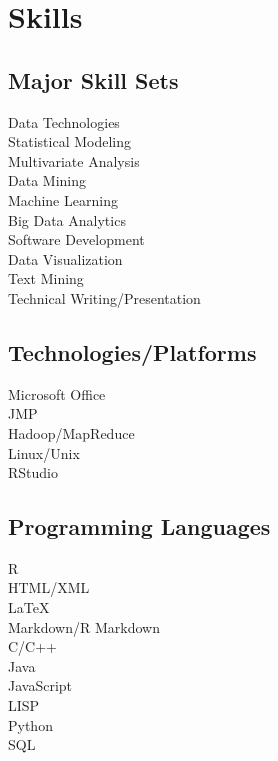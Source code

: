 \documentclass[letterpaper]{deedy-resume} %
\begin{document}
\begin{minipage}[t]{0.35\textwidth}

\section{Skills}
\subsection{Major Skill Sets}
Data Technologies\\
Statistical Modeling\\
Multivariate Analysis\\
Data Mining\\
Machine Learning\\
Big Data Analytics\\
Software Development\\
Data Visualization\\
Text Mining\\
Technical Writing/Presentation

\sectionspace %

\subsection{Technologies/Platforms}
Microsoft Office\\
JMP\\
Hadoop/MapReduce\\
Linux/Unix\\
RStudio\\

\sectionspace %

\subsection{Programming Languages}
R\\
HTML/XML\\
\LaTeX\\
Markdown/R Markdown\\
\sectionspace
{}
C/C++\\
Java\\
JavaScript\\
LISP\\
Python\\
SQL\\



\end{minipage} %
\end{document}
